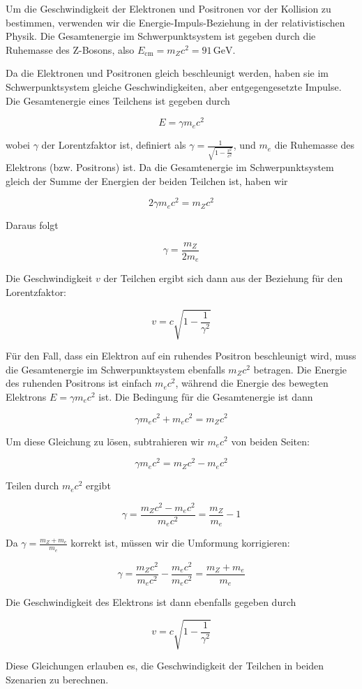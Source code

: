Um die Geschwindigkeit der Elektronen und Positronen vor der Kollision zu bestimmen, verwenden wir die Energie-Impuls-Beziehung in der relativistischen Physik. Die Gesamtenergie im Schwerpunktsystem ist gegeben durch die Ruhemasse des Z-Bosons, also \( E_{\text{cm}} = m_Z c^2 = 91 \, \text{GeV} \).

Da die Elektronen und Positronen gleich beschleunigt werden, haben sie im Schwerpunktsystem gleiche Geschwindigkeiten, aber entgegengesetzte Impulse. Die Gesamtenergie eines Teilchens ist gegeben durch

\[
E = \gamma m_e c^2
\]

wobei \(\gamma\) der Lorentzfaktor ist, definiert als \(\gamma = \frac{1}{\sqrt{1 - \frac{v^2}{c^2}}}\), und \(m_e\) die Ruhemasse des Elektrons (bzw. Positrons) ist. Da die Gesamtenergie im Schwerpunktsystem gleich der Summe der Energien der beiden Teilchen ist, haben wir

\[
2 \gamma m_e c^2 = m_Z c^2
\]

Daraus folgt

\[
\gamma = \frac{m_Z}{2 m_e}
\]

Die Geschwindigkeit \(v\) der Teilchen ergibt sich dann aus der Beziehung für den Lorentzfaktor:

\[
v = c \sqrt{1 - \frac{1}{\gamma^2}}
\]

Für den Fall, dass ein Elektron auf ein ruhendes Positron beschleunigt wird, muss die Gesamtenergie im Schwerpunktsystem ebenfalls \(m_Z c^2\) betragen. Die Energie des ruhenden Positrons ist einfach \(m_e c^2\), während die Energie des bewegten Elektrons \(E = \gamma m_e c^2\) ist. Die Bedingung für die Gesamtenergie ist dann

\[
\gamma m_e c^2 + m_e c^2 = m_Z c^2
\]

Um diese Gleichung zu lösen, subtrahieren wir \(m_e c^2\) von beiden Seiten:

\[
\gamma m_e c^2 = m_Z c^2 - m_e c^2
\]

Teilen durch \(m_e c^2\) ergibt

\[
\gamma = \frac{m_Z c^2 - m_e c^2}{m_e c^2} = \frac{m_Z}{m_e} - 1
\]

Da \(\gamma = \frac{m_Z + m_e}{m_e}\) korrekt ist, müssen wir die Umformung korrigieren:

\[
\gamma = \frac{m_Z c^2}{m_e c^2} - \frac{m_e c^2}{m_e c^2} = \frac{m_Z + m_e}{m_e}
\]

Die Geschwindigkeit des Elektrons ist dann ebenfalls gegeben durch

\[
v = c \sqrt{1 - \frac{1}{\gamma^2}}
\]

Diese Gleichungen erlauben es, die Geschwindigkeit der Teilchen in beiden Szenarien zu berechnen.

